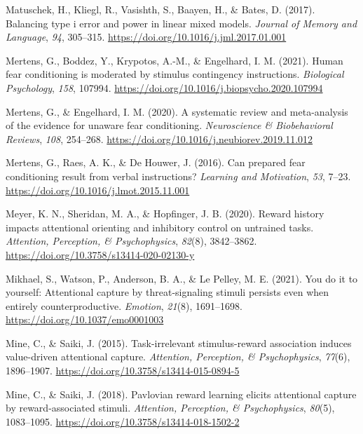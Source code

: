 \documentclass[
  man,
  floatsintext,
  longtable,
  nolmodern,
  notxfonts,
  notimes,
  mask,
  colorlinks=true,linkcolor=blue,citecolor=blue,urlcolor=blue]{apa7}
\newlength{\cslhangindent}
\newenvironment{CSLReferences}[2] %
 {\begin{list}{}{%
  \setlength{\itemindent}{0pt}
  \setlength{\leftmargin}{0pt}
  \setlength{\parsep}{0pt}
  \ifodd #1
   \setlength{\leftmargin}{\cslhangindent}
   \setlength{\itemindent}{-1\cslhangindent}
  \fi
  \setlength{\itemsep}{#2\baselineskip}}}
 {\end{list}}
\begin{document}
\begin{CSLReferences}{1}{0}
Matuschek, H., Kliegl, R., Vasishth, S., Baayen, H., \& Bates, D.
(2017). Balancing type i error and power in linear mixed models.
\emph{Journal of Memory and Language}, \emph{94}, 305--315.
\url{https://doi.org/10.1016/j.jml.2017.01.001}

Mertens, G., Boddez, Y., Krypotos, A.-M., \& Engelhard, I. M. (2021).
Human fear conditioning is moderated by stimulus contingency
instructions. \emph{Biological Psychology}, \emph{158}, 107994.
\url{https://doi.org/10.1016/j.biopsycho.2020.107994}

Mertens, G., \& Engelhard, I. M. (2020). A systematic review and
meta-analysis of the evidence for unaware fear conditioning.
\emph{Neuroscience \& Biobehavioral Reviews}, \emph{108}, 254--268.
\url{https://doi.org/10.1016/j.neubiorev.2019.11.012}

Mertens, G., Raes, A. K., \& De Houwer, J. (2016). Can prepared fear
conditioning result from verbal instructions? \emph{Learning and
Motivation}, \emph{53}, 7--23.
\url{https://doi.org/10.1016/j.lmot.2015.11.001}

Meyer, K. N., Sheridan, M. A., \& Hopfinger, J. B. (2020). Reward
history impacts attentional orienting and inhibitory control on
untrained tasks. \emph{Attention, Perception, \& Psychophysics},
\emph{82}(8), 3842--3862.
\url{https://doi.org/10.3758/s13414-020-02130-y}

Mikhael, S., Watson, P., Anderson, B. A., \& Le Pelley, M. E. (2021).
You do it to yourself: Attentional capture by threat-signaling stimuli
persists even when entirely counterproductive. \emph{Emotion},
\emph{21}(8), 1691--1698. \url{https://doi.org/10.1037/emo0001003}

Mine, C., \& Saiki, J. (2015). Task-irrelevant stimulus-reward
association induces value-driven attentional capture. \emph{Attention,
Perception, \& Psychophysics}, \emph{77}(6), 1896--1907.
\url{https://doi.org/10.3758/s13414-015-0894-5}

Mine, C., \& Saiki, J. (2018). Pavlovian reward learning elicits
attentional capture by reward-associated stimuli. \emph{Attention,
Perception, \& Psychophysics}, \emph{80}(5), 1083--1095.
\url{https://doi.org/10.3758/s13414-018-1502-2}


\end{CSLReferences}
\end{document}
